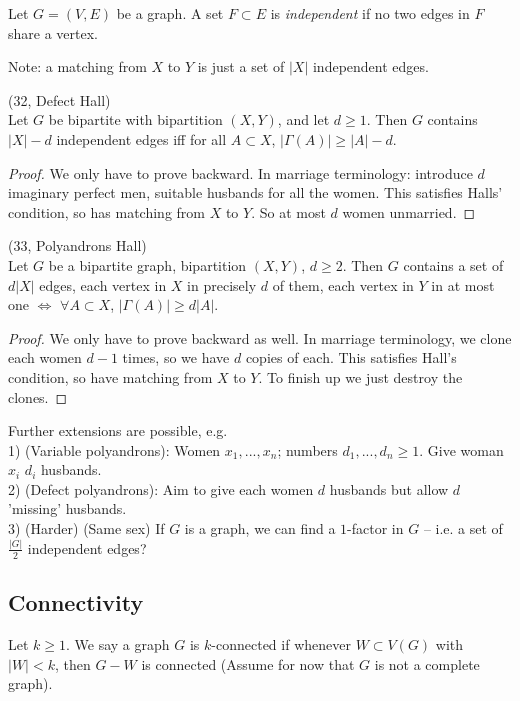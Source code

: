 \documentclass[a4paper]{article}
\begin{document}
\begin{defi}
Let $G=(V,E)$ be a graph. A set $F \subset E$ is \emph{independent} if no two edges in $F$ share a vertex.

Note: a matching from $X$ to $Y$ is just a set of $|X|$ independent edges.
\end{defi}

\begin{coro} (32, Defect Hall)\\
Let $G$ be bipartite with bipartition $(X,Y)$, and let $d \geq 1$. Then $G$ contains $|X|-d$ independent edges iff for all $A \subset X$, $|\Gamma(A)| \geq |A|-d$.
\begin{proof}
We only have to prove backward. In marriage terminology: introduce $d$ imaginary perfect men, suitable husbands for all the women. This satisfies Halls' condition, so has matching from $X$ to $Y$. So at most $d$ women unmarried.
\end{proof}
\end{coro}

\begin{coro} (33, Polyandrons Hall)\\
Let $G$ be a bipartite graph, bipartition $(X,Y)$, $d \geq 2$. Then $G$ contains a set of $d|X|$ edges, each vertex in $X$ in precisely $d$ of them, each vertex in $Y$ in at most one $\iff$ $\forall A \subset X$, $|\Gamma(A)| \geq d|A|$.
\begin{proof}
We only have to prove backward as well. In marriage terminology, we clone each women $d-1$ times, so we have $d$ copies of each. This satisfies Hall's condition, so have matching from $X$ to $Y$. To finish up we just destroy the clones.
\end{proof}
\end{coro}

Further extensions are possible, e.g.\\
1) (Variable polyandrons): Women $x_1,...,x_n$; numbers $d_1,...,d_n \geq 1$. Give woman $x_i$ $d_i$ husbands.\\
2) (Defect polyandrons): Aim to give each women $d$ husbands but allow $d$ 'missing' husbands.\\
3) (Harder) (Same sex) If $G$ is a graph, we can find a $1$-factor in $G$ -- i.e. a set of $\frac{|G|}{2}$ independent edges?

\subsection{Connectivity}
Let $k \geq 1$. We say a graph $G$ is $k$-connected if whenever $W \subset V(G)$ with $|W| < k$, then $G-W$ is connected (Assume for now that $G$ is not a complete graph).
\end{document}
